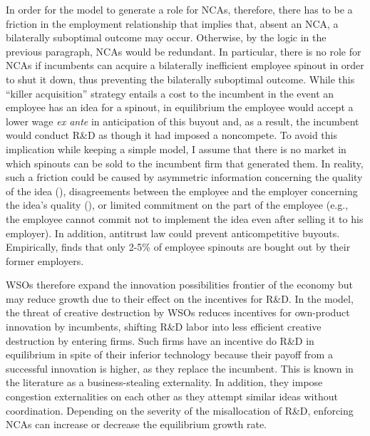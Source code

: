 \documentclass[11pt,english]{article}
\theoremstyle{definition}
\begin{document}
In order for the model to generate a role for NCAs, therefore, there has to be a friction in the employment relationship that implies that, absent an NCA, a bilaterally suboptimal outcome may occur. Otherwise, by the logic in the previous paragraph, NCAs would be redundant. In particular, there is no role for NCAs if incumbents can acquire a bilaterally inefficient employee spinout in order to shut it down, thus preventing the bilaterally suboptimal outcome. While this ``killer acquisition'' strategy entails a cost to the incumbent in the event an employee has an idea for a spinout, in equilibrium the employee would accept a lower wage \textit{ex ante} in anticipation of this buyout and, as a result, the incumbent would conduct R\&D as though it had imposed a noncompete. To avoid this implication while keeping a simple model, I assume that there is no market in which spinouts can be sold to the incumbent firm that generated them. In reality, such a friction could be caused by asymmetric information concerning the quality of the idea (\cite{chatterjee_spinoffs_2012}), disagreements between the employee and the employer concerning the idea's quality (\cite{klepper_disagreements_2007}), or limited commitment on the part of the employee (e.g., the employee cannot commit not to implement the idea even after selling it to his employer). In addition, antitrust law could prevent anticompetitive buyouts. Empirically, \cite{babina_entrepreneurial_2019} finds that only 2-5\% of employee spinouts are bought out by their former employers.

WSOs therefore expand the innovation possibilities frontier of the economy but may reduce growth due to their effect on the incentives for R\&D. In the model, the threat of creative destruction by WSOs reduces incentives for own-product innovation by incumbents, shifting R\&D labor into less efficient creative destruction by entering firms. Such firms have an incentive do R\&D in equilibrium in spite of their inferior technology because their payoff from a successful innovation is higher, as they replace the incumbent. This is known in the literature as a business-stealing externality. In addition, they impose congestion externalities on each other as they attempt similar ideas without coordination. Depending on the severity of the misallocation of R\&D, enforcing NCAs can increase or decrease the equilibrium growth rate. 
\end{document}
